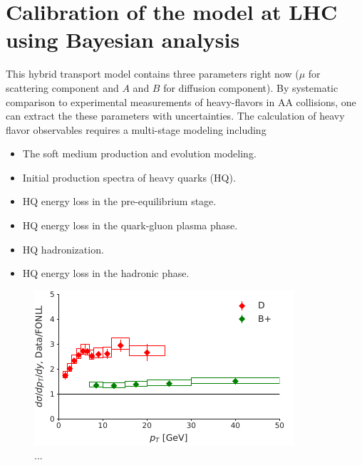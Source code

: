 \documentclass[aps, prc, reprint, amsmath, groupedaddress, nofootinbib]{revtex4-1}
\begin{document}
\section{Calibration of the model at LHC using Bayesian analysis}\label{section:calibration}
This hybrid transport model contains three parameters right now ($\mu$ for scattering component and $A$ and $B$ for diffusion component).
By systematic comparison to experimental measurements of heavy-flavors in AA collisions, one can extract the these parameters with uncertainties.
The calculation of heavy flavor observables requires a multi-stage modeling including
\begin{itemize}
\item The soft medium production and evolution modeling.
\item Initial production spectra of heavy quarks (HQ).
\item HQ energy loss in the pre-equilibrium stage.
\item HQ energy loss in the quark-gluon plasma phase.
\item HQ hadronization.
\item HQ energy loss in the hadronic phase.
\end{itemize}


\begin{figure}
\includegraphics[width=\columnwidth]{baseline.pdf}
\caption{...}\label{plots:baseline}
\end{figure}
\end{document}
